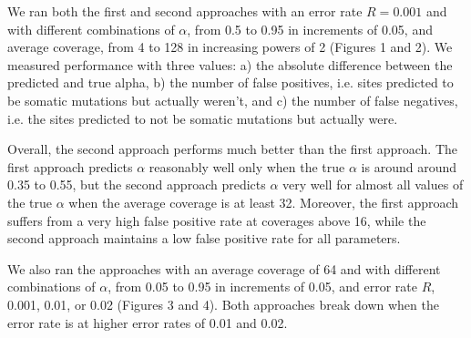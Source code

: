 \documentclass[12pt]{article}
\begin{document}
We ran both the first and second approaches with an error rate $R=0.001$
and with different combinations of $\alpha$, from 0.5 to 0.95 in
increments of 0.05, and average coverage, from 4 to 128 in increasing
powers of 2 (Figures 1 and 2).  We measured performance with three
values: a) the absolute difference between the predicted and true
alpha, b) the number of false positives, i.e. sites predicted to be
somatic mutations but actually weren't, and c) the number of false
negatives, i.e. the sites predicted to not be somatic mutations but
actually were.

Overall, the second approach performs much better than the first
approach.  The first approach predicts $\alpha$ reasonably well only
when the true $\alpha$ is around around 0.35 to 0.55, but the second
approach predicts $\alpha$ very well for almost all values of the true
$\alpha$ when the average coverage is at least 32.  Moreover, the
first approach suffers from a very high false positive rate at
coverages above 16, while the second approach maintains a low false
positive rate for all parameters.

We also ran the approaches with an average coverage of 64 and with
different combinations of $\alpha$, from 0.05 to 0.95 in increments of
0.05, and error rate $R$, 0.001, 0.01, or 0.02 (Figures 3 and 4).  Both
approaches break down when the error rate is at higher error rates of
0.01 and 0.02.
\end{document}

